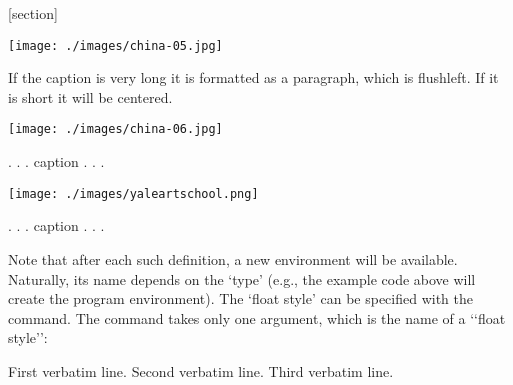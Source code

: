 \begin{teXXX}
[section]
\end{teXXX}





\begin{Photo}
 \centering
 \texttt{[image: ./images/china-05.jpg]}
\caption[a short caption]{If the caption is very long it is formatted as a paragraph, which is flushleft. If it is short it will be centered. }
\end{Photo}


\begin{Photo}
 \centering
 \texttt{[image: ./images/china-06.jpg]}
\caption{. . . caption . . . }
\end{Photo}

\begin{Photo}
 \centering
 \texttt{[image: ./images/yaleartschool.png]}
\caption{. . . caption . . . }
\end{Photo}



Note that after each such definition, a new 
environment will be available. Naturally,
its name depends on the `type' (e.g., the example code above will create the program
environment). The `float style' can be specified with the  command. The
command takes only one argument, which is the name of a ‘‘float style’’:

\begin{teXXX}
\begin{Example}
     First verbatim line.
     Second verbatim line.
     Third verbatim line.
\end{Example}
\end{teXXX}

\endinput

\floatstyle{ruled}
\newfloat{Example}{htbp}{loe}[chapter]

 \begin{Example}
 \begin{verbatim}
   \begin{Photo}
      \centering
      \texttt{[image: ./graphics/level3.jpg]}
      \caption{. . . caption . . . }
   \end{Photo}
\end{verbatim}
\caption{Example using verbatim code}
 \end{Example}

